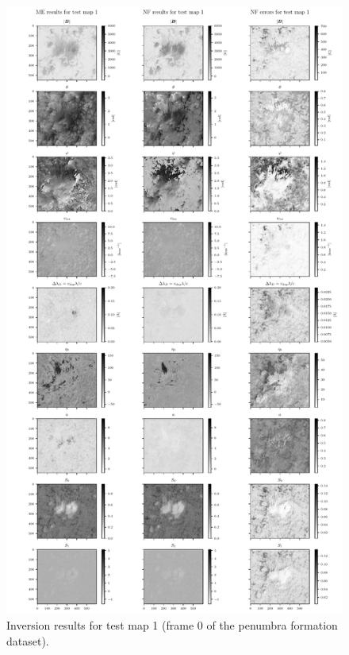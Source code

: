 \documentclass[a4paper,12pt]{report}
\begin{document}
\begin{figure}
\centering
\includegraphics[height=\textheight-1cm]{figures/nf-milne-eddington-example-4-nflows-piecewisequadratic-comp-ME-NF-testmap1.pdf}
\caption{Inversion results for test map 1 (frame 0 of the penumbra formation dataset).}
\label{fig:nf-milne-eddington-example-4-nflows-piecewisequadratic-comp-ME-NF-testmap1}
\end{figure}
\end{document}
